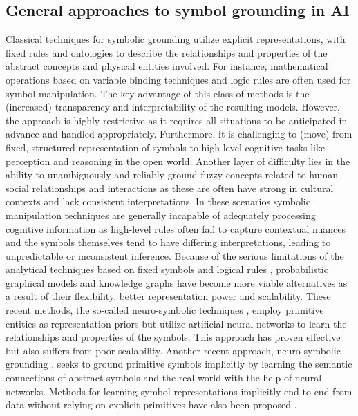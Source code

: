 \documentclass[10pt,journal,compsoc]{IEEEtran}
\begin{document}
	\subsection{General approaches to symbol grounding in AI}
	
	Classical techniques for symbolic grounding utilize explicit representations, with fixed rules and ontologies to describe the relationships and properties of the abstract concepts and physical entities involved. For instance, mathematical operations based on variable binding techniques \cite{smolensky1990tensor,frady2021variable} and logic rules \cite{glanois2022neuro,sen2021combining,belle2020symbolic}are often used for symbol manipulation.
	The key advantage of this class of methods is the (increased) transparency and interpretability of the resulting models. However, the approach is highly restrictive as it requires all situations to be anticipated in advance and handled appropriately.  Furthermore, it is challenging to (move) from fixed, structured representation of symbols to high-level cognitive tasks like perception and reasoning in the open world. Another layer of difficulty lies in the ability to unambiguously and reliably ground fuzzy concepts related to human social relationships and interactions as these are often have strong in cultural contexts and lack consistent interpretations. In these scenarios symbolic manipulation techniques are generally incapable of adequately processing cognitive information as high-level rules often fail to capture contextual nuances and the symbols themselves tend to have differing interpretations, leading to unpredictable or inconsistent inference. Because of the serious limitations of the analytical techniques based on fixed symbols and logical rules \cite{correia2014logical}, probabilistic graphical models \cite{tellex2011approaching,kollar2013generalized} and knowledge graphs \cite{guo2016jointly,chaudhuri2021grounding,ji2021survey}  have become more viable alternatives as a result of their flexibility, better representation power and scalability. These recent methods, the so-called neuro-symbolic techniques \cite{de2011neural,liu2024beyond,cheng2024neural,demeter2020just}, employ primitive entities as representation priors but utilize artificial neural networks to learn the relationships and properties of the symbols. This approach has proven effective but also suffers from poor scalability. Another recent approach, neuro-symbolic grounding \cite{li2024softened,zellers2021piglet,hsu2023ns3d, mao2019neuro }, seeks to ground primitive symbols implicitly by learning the semantic connections of abstract symbols and the real world with the help of neural networks. Methods for learning symbol representations implicitly end-to-end from data without relying on explicit primitives have also been proposed \cite{deng2023transvg++,pavlick2023symbols,huang2024grounded,li2024groundinggpt}. 
	
\end{document}
